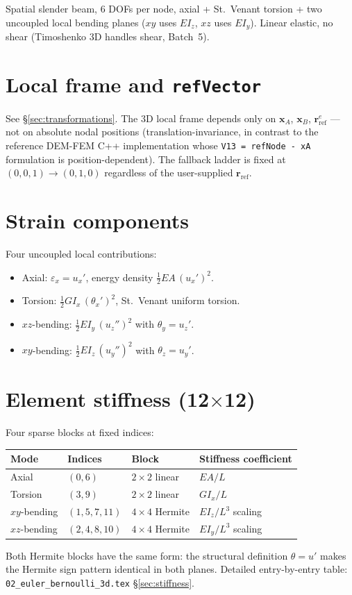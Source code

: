 \documentclass[11pt,a4paper]{book}
\newcommand{\bmath}[1]{\boldsymbol{#1}}
\begin{document}
Spatial slender beam, 6 DOFs per node, axial + St.\ Venant torsion + two uncoupled local bending planes ($xy$ uses $E I_z$, $xz$ uses $E I_y$). Linear elastic, no shear (Timoshenko 3D handles shear, Batch~5).

\section{Local frame and \texttt{refVector}}

See \S\ref{sec:transformations}. The 3D local frame depends only on $\bmath{x}_A$, $\bmath{x}_B$, $\bmath{r}_{\text{ref}}^e$ --- not on absolute nodal positions (translation-invariance, in contrast to the reference DEM-FEM C++ implementation whose \texttt{V13 = refNode - xA} formulation is position-dependent). The fallback ladder is fixed at $(0,0,1) \to (0,1,0)$ regardless of the user-supplied $\bmath{r}_{\text{ref}}$.

\section{Strain components}

Four uncoupled local contributions:
\begin{itemize}
    \item Axial: $\varepsilon_x = u_x'$, energy density $\tfrac{1}{2} EA\,(u_x')^2$.
    \item Torsion: $\tfrac{1}{2} G I_x\,(\theta_x')^2$, St.\ Venant uniform torsion.
    \item $xz$-bending: $\tfrac{1}{2} E I_y\,(u_z'')^2$ with $\theta_y = u_z'$.
    \item $xy$-bending: $\tfrac{1}{2} E I_z\,(u_y'')^2$ with $\theta_z = u_y'$.
\end{itemize}

\section{Element stiffness (12\texorpdfstring{$\times$}{x}12)}

Four sparse blocks at fixed indices:
\begin{center}
\begin{tabular}{l l l l}
\toprule
Mode & Indices & Block & Stiffness coefficient \\
\midrule
Axial    & $(0, 6)$           & $2\times 2$ linear & $EA/L$ \\
Torsion  & $(3, 9)$           & $2\times 2$ linear & $G I_x / L$ \\
$xy$-bending & $(1, 5, 7, 11)$    & $4\times 4$ Hermite & $E I_z / L^3$ scaling \\
$xz$-bending & $(2, 4, 8, 10)$    & $4\times 4$ Hermite & $E I_y / L^3$ scaling \\
\bottomrule
\end{tabular}
\end{center}
Both Hermite blocks have the same form: the structural definition $\theta = u'$ makes the Hermite sign pattern identical in both planes. Detailed entry-by-entry table: \texttt{02\_euler\_bernoulli\_3d.tex} \S\ref{sec:stiffness}.
\end{document}
